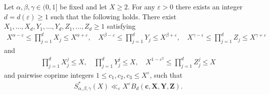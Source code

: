 \begin{proposition}\label{prop:DiophantineReduction}
Let $\alpha,\beta,\gamma\in (0,1]$ be fixed and let $X\geq 2$. For any $\varepsilon>0$ there exists an integer $d=d(\varepsilon)\geq 1$ such that the following holds.
There exist $X_1,\ldots, X_d,Y_1,\ldots, Y_d, Z_1,\ldots, Z_d\geq 1$ satisfying
\begin{align}\label{eq:xiyizi_1}
X^{\alpha-\varepsilon}\leq \prod_{j=1}^{d}X_j\leq X^{\alpha+\varepsilon},\quad
X^{\beta-\varepsilon}\leq\prod_{j=1}^{d}Y_j\leq X^{\beta+\varepsilon},\quad
X^{\gamma-\varepsilon}\leq\prod_{j=1}^{d}Z_j\leq X^{\gamma+\varepsilon}
\end{align}
and
\begin{align}\label{eq:xiyizi_2}
\prod_{j=1}^d X_j^j \leq X, \quad \prod_{j=1}^d Y_j^j\leq X,\quad X^{1-\varepsilon^2}\leq \prod_{j=1}^d Z_j^j\leq X
\end{align}
and pairwise coprime integers $1\leq c_1,c_2,c_3\leq X^{\varepsilon}$, such that
\begin{align*}
S^*_{\alpha,\beta,\gamma}(X) \ll_{\varepsilon} X^{\varepsilon}B_d(\mathbf{c},\mathbf{X},\mathbf{Y},\mathbf{Z}).
\end{align*}
\end{proposition}

